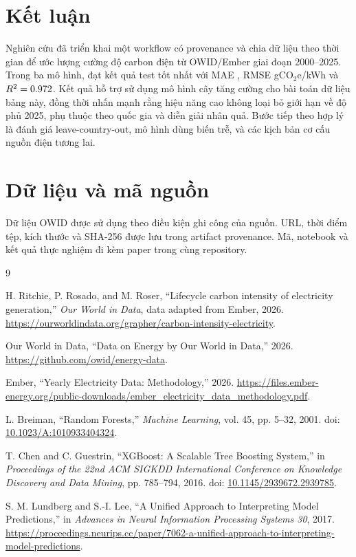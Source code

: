 \documentclass[11pt,a4paper]{article}
\begin{document}
\section{Kết luận}

Nghiên cứu đã triển khai một workflow có provenance và chia dữ liệu theo thời
gian để ước lượng cường độ carbon điện từ OWID/Ember giai đoạn 2000--2025.
Trong ba mô hình, \BestModel{} đạt kết quả test tốt nhất với MAE
\BestTestMAE{}, RMSE \BestTestRMSE{} gCO$_2$e/kWh và
$R^2=0.972$. Kết quả hỗ trợ sử dụng mô hình cây tăng cường cho bài
toán dữ liệu bảng này, đồng thời nhấn mạnh rằng hiệu năng cao không loại bỏ giới
hạn về độ phủ 2025, phụ thuộc theo quốc gia và diễn giải nhân quả. Bước tiếp theo
hợp lý là đánh giá leave-country-out, mô hình dùng biến trễ, và các kịch bản cơ
cấu nguồn điện tương lai.

\section*{Dữ liệu và mã nguồn}

Dữ liệu OWID được sử dụng theo điều kiện ghi công của nguồn. URL, thời điểm tệp,
kích thước và SHA-256 được lưu trong artifact provenance. Mã, notebook và kết
quả thực nghiệm đi kèm paper trong cùng repository.

\begin{thebibliography}{9}

H. Ritchie, P. Rosado, and M. Roser,
``Lifecycle carbon intensity of electricity generation,''
\emph{Our World in Data}, data adapted from Ember, 2026.
\url{https://ourworldindata.org/grapher/carbon-intensity-electricity}.

Our World in Data,
``Data on Energy by Our World in Data,'' 2026.
\url{https://github.com/owid/energy-data}.

Ember,
``Yearly Electricity Data: Methodology,'' 2026.
\url{https://files.ember-energy.org/public-downloads/ember_electricity_data_methodology.pdf}.

L. Breiman,
``Random Forests,'' \emph{Machine Learning}, vol. 45, pp. 5--32, 2001.
doi: \href{https://doi.org/10.1023/A:1010933404324}{10.1023/A:1010933404324}.

T. Chen and C. Guestrin,
``XGBoost: A Scalable Tree Boosting System,'' in \emph{Proceedings of the 22nd
ACM SIGKDD International Conference on Knowledge Discovery and Data Mining},
pp. 785--794, 2016.
doi: \href{https://doi.org/10.1145/2939672.2939785}{10.1145/2939672.2939785}.

S. M. Lundberg and S.-I. Lee,
``A Unified Approach to Interpreting Model Predictions,'' in
\emph{Advances in Neural Information Processing Systems 30}, 2017.
\url{https://proceedings.neurips.cc/paper/7062-a-unified-approach-to-interpreting-model-predictions}.

\end{thebibliography}
\end{document}
